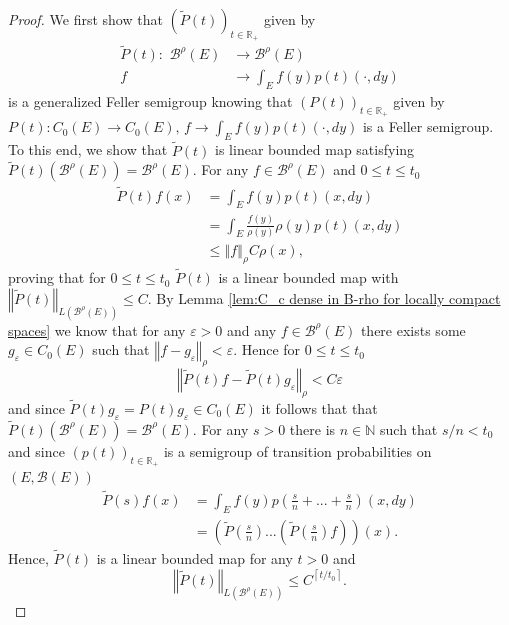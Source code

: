 \documentclass[a4paper,12pt]{article}
\theoremstyle{definition}
\theoremstyle{remark}
\numberwithin{equation}{section}
\numberwithin{theorem}{section}
\begin{document}
\begin{proof}
We first show that $\left(\tilde{P}(t)\right)_{t\in\mathbb{R}_{+}}$
given by 
\begin{align*}
\tilde{P}(t):\,\,\mathcal{\mathscr{B}}^{\rho}(E) & \rightarrow\mathcal{\mathscr{B}}^{\rho}(E)\\
f & \rightarrow\int_{E}f(y)p(t)(\cdot,dy)
\end{align*}
 is a generalized Feller semigroup knowing that $\left(P(t)\right)_{t\in\mathbb{R}_{+}}$
given by $
P(t): C_{0}(E)  \rightarrow C_{0}(E), \, 
f  \rightarrow\int_{E}f(y)p(t)(\cdot,dy)
$ is a Feller semigroup. 
To this end, we show that $\tilde{P}(t) $ is linear bounded map satisfying $\tilde{P}(t)\left(\mathcal{\mathscr{B}}^{\rho}(E)\right)=\mathcal{\mathscr{B}}^{\rho}(E)$. For any $f\in\mathcal{\mathscr{B}}^{\rho}(E)$
and $0\leq t\leq t_{0}$
\begin{align*}
\tilde{P}(t)f(x) & =\int_{E}f(y)p(t)(x,dy)\\
 & =\int_{E}\frac{f(y)}{\rho(y)}\rho(y)p(t)(x,dy)\\
 & \leq\left\Vert f\right\Vert _{\rho}C\rho(x),
\end{align*}
proving that  for $0\leq t\leq t_{0}$
$
\tilde{P}(t)$ 
is a linear bounded map with
$
\left\Vert \tilde{P}(t)\right\Vert _{L\left(\mathscr{B}^{\rho}(E)\right)}\leq C.
$
By Lemma \ref{lem:C_c dense in  B-rho for locally compact spaces} we know that
for any $\varepsilon>0$ and any $f\in\mathscr{B}^{\rho}(E)$ there
exists some $g_{\varepsilon}\in C_{0}(E)$ such that $\left\Vert f-g_{\varepsilon}\right\Vert _{\rho}<\varepsilon.$
Hence for $0\leq t\leq t_{0}$
\[
\left\Vert \tilde{P}(t)f-\tilde{P}(t)g_{\varepsilon}\right\Vert _{\rho}<C\varepsilon
\]
 and since $\tilde{P}(t)g_{\varepsilon}=P(t)g_{\varepsilon}\in C_{0}(E)$
it follows that that $\tilde{P}(t)(\mathcal{\mathscr{B}}^{\rho}(E))=\mathcal{\mathscr{B}}^{\rho}(E).$
For any $s>0$ there is $n\in\mathbb{N}$ such that $s/n<t_{0}$ and
since $\left(p(t)\right)_{t\in\mathbb{R}_{+}}$ is a semigroup of
transition probabilities on $\left(E,\mathcal{B}(E)\right)$
\begin{align*}
\tilde{P}(s)f(x) & =\int_{E}f(y)p(\frac{s}{n}+...+\frac{s}{n})(x,dy)\\
 & =\left(\tilde{P}(\frac{s}{n})...\left(\tilde{P}(\frac{s}{n})f\right)\right)(x).
\end{align*}
Hence, $\tilde{P}(t)$
is a linear bounded map for any $t>0$ and
\[
\left\Vert \tilde{P}(t)\right\Vert _{L\left(\mathscr{B}^{\rho}(E)\right)}\leq C^{\left\lceil t/t_{0}\right\rceil }.
\]

\end{proof}
\end{document}
